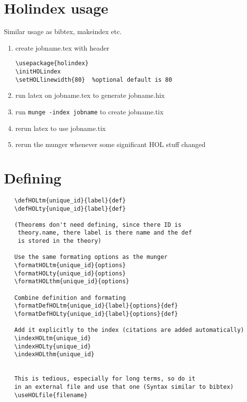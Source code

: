 \documentclass{article}
\begin{document}
\section{Holindex usage}

Similar usage as bibtex, makeindex etc.

\begin{enumerate}
\item create jobname.tex with header
\begin{verbatim}
\usepackage{holindex}
\initHOLindex
\setHOLlinewidth{80}  %optional default is 80
\end{verbatim}
\item run latex on jobname.tex to generate jobname.hix
\item run \texttt{munge -index jobname} to create jobname.tix
\item rerun latex to use jobname.tix
\item rerun the munger whenever some significant HOL stuff changed
\end{enumerate}

\section{Defining}
\begin{verbatim}
   \defHOLtm{unique_id}{label}{def}
   \defHOLty{unique_id}{label}{def}

   (Theorems don't need defining, since there ID is 
    theory.name, there label is there name and the def
    is stored in the theory)

   Use the same formating options as the munger
   \formatHOLtm{unique_id}{options}
   \formatHOLty{unique_id}{options}
   \formatHOLthm{unique_id}{options}

   Combine definition and formating
   \formatDefHOLtm{unique_id}{label}{options}{def}
   \formatDefHOLty{unique_id}{label}{options}{def}

   Add it explicitly to the index (citations are added automatically)
   \indexHOLtm{unique_id}
   \indexHOLty{unique_id}
   \indexHOLthm{unique_id}


   This is tedious, especially for long terms, so do it
   in an external file and use that one (Syntax similar to bibtex)
   \useHOLfile{filename}
\end{verbatim}


\end{document}
